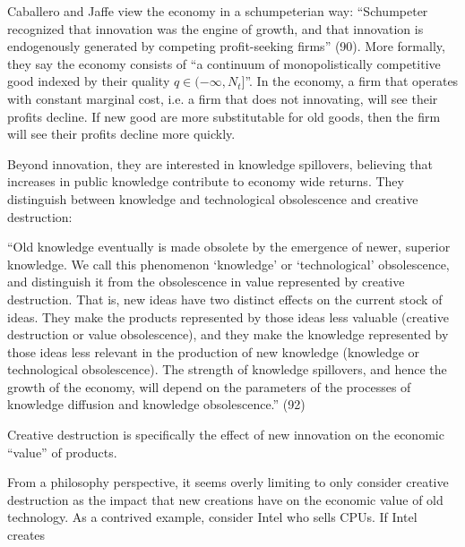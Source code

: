 \documentclass[11pt]{article}
\begin{document}
Caballero and Jaffe view the economy in a schumpeterian way: ``Schumpeter recognized that innovation was the engine of growth, and that innovation is endogenously generated by competing profit-seeking firms'' (90). 
More formally, they say the economy consists of ``a continuum of monopolistically competitive good indexed by their quality $q \in (-\infty, N_t]$''.
In the economy, a firm that operates with constant marginal cost, i.e. a firm that does not innovating, will see their profits decline. 
If new good are more substitutable for old goods, then the firm will see their profits decline more quickly.

Beyond innovation, they are interested in knowledge spillovers, believing that increases in public knowledge contribute to economy wide returns.
They distinguish between knowledge and technological obsolescence and creative destruction:
\begin{displayquote}
``Old knowledge eventually is made obsolete by the emergence of newer, superior knowledge. We call this phenomenon `knowledge' or `technological' obsolescence, and distinguish it from the obsolescence in value represented by creative destruction.
That is, new ideas have two distinct effects on the current stock of ideas. 
They make the products represented by those ideas less valuable (creative destruction or value obsolescence), and they make the knowledge represented by those ideas less relevant in the production of new knowledge (knowledge or technological obsolescence). 
The strength of knowledge spillovers, and hence the growth of the economy, will depend on the parameters of the processes of knowledge diffusion and knowledge obsolescence.'' (92)
\end{displayquote}
Creative destruction is specifically the effect of new innovation on the economic ``value'' of products.

From a philosophy perspective, it seems overly limiting to only consider creative destruction as the impact that new creations have on the economic value of old technology.
As a contrived example, consider Intel who sells CPUs. 
If Intel creates 
\end{document}
